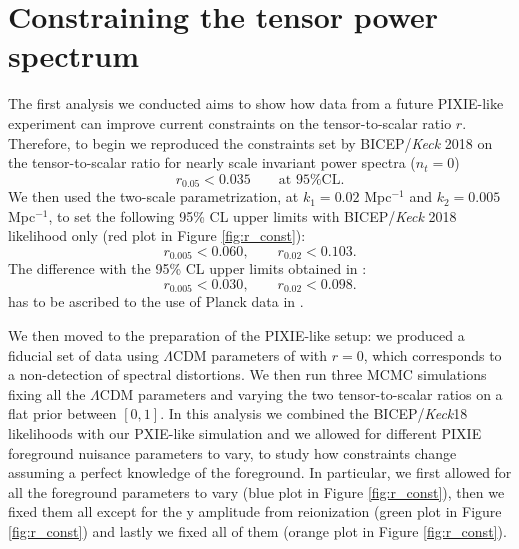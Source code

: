 \section{Constraining the tensor power spectrum}
The first analysis we conducted aims to show how data from a future PIXIE-like experiment can improve current constraints on the tensor-to-scalar ratio $r$. Therefore, to begin we reproduced the constraints set by BICEP/\emph{Keck} 2018 on the tensor-to-scalar ratio for nearly scale invariant power spectra ($n_t=0$) 
\begin{equation*}
r_{0.05}< 0.035\qquad \text{at 95\% CL.}
\end{equation*}
We then used the two-scale parametrization,  at $k_1=0.02$ Mpc$^{-1}$ and $k_2=0.005$ Mpc$^{-1}$, to set the following 95\% CL upper limits with BICEP/\textit{Keck} 2018 likelihood only (red plot in Figure \ref{fig:r_const}):
\begin{equation*}
r_{0.005}<0.060, \qquad r_{0.02}<0.103 .
\end{equation*}
The difference with the 95\% CL upper limits obtained in \cite{Paoletti_2022}:
\begin{equation*}
r_{0.005}<0.030, \qquad r_{0.02}<0.098 .
\end{equation*}
has to be ascribed to the use of Planck data in \cite{Paoletti_2022}.

We then moved to the preparation of the PIXIE-like setup: we produced a fiducial set of data using $\Lambda$CDM parameters of \cite{planck2018results} with $r=0$, which corresponds to a non-detection of spectral distortions. We then run three MCMC simulations fixing all the $\Lambda$CDM parameters and varying the two tensor-to-scalar ratios on a flat prior between $[0,1]$. In this analysis we combined the BICEP/\emph{Keck}18 likelihoods with our PXIE-like simulation and we allowed for different PIXIE foreground nuisance parameters to vary, to study how constraints change assuming a perfect knowledge of the foreground. In particular, we first allowed for all the foreground parameters to vary (blue plot in Figure \ref{fig:r_const}), then we fixed them all except for the y amplitude from reionization (green plot in Figure \ref{fig:r_const}) and lastly we fixed all of them (orange plot in Figure \ref{fig:r_const}). 

